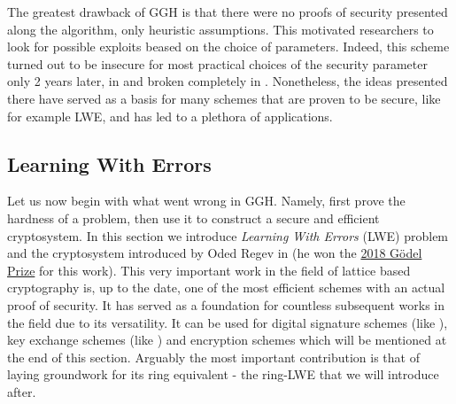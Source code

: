 The greatest drawback of GGH is that there were no proofs of security presented along the algorithm, only heuristic assumptions. This motivated researchers to look for possible exploits beased on the choice of parameters. Indeed, this scheme turned out to be insecure for most practical choices of the security parameter only 2 years later, in \cite{break1} and broken completely in \cite{break2}. Nonetheless, the ideas presented there have served as a basis for many schemes that are proven to be secure, like for example LWE, and has led to a plethora of applications.
\subsection{Learning With Errors}
Let us now begin with what went wrong in GGH. Namely, first prove the hardness of a problem, then use it to construct a secure and efficient cryptosystem. In this section we introduce \textit{Learning With Errors} (LWE) problem and the cryptosystem introduced by Oded Regev in \cite{regev} (he won the \href{https://eatcs.org/index.php/component/content/article/1-news/2670-2018-godel-prize}{2018 Gödel Prize} for this work). This very important work in the field of lattice based cryptography is, up to the date, one of the most efficient schemes with an actual proof of security. It has served as a foundation for countless subsequent works in the field due to its versatility. It can be used for digital signature schemes (like \cite{dbs}), key exchange schemes (like \cite{kes}) and encryption schemes which will be mentioned at the end of this section. Arguably the most important contribution is that of laying groundwork for its ring equivalent - the ring-LWE \cite{ring-lwe} that we will introduce after.
